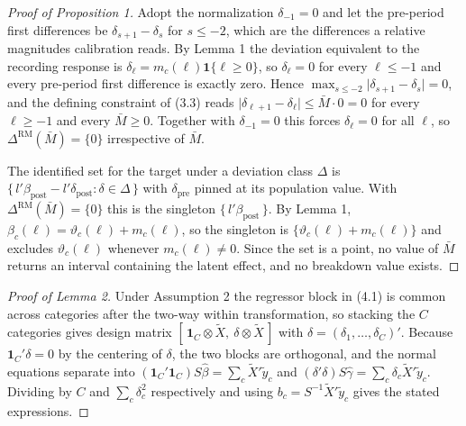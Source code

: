 \documentclass[12pt]{article}
\theoremstyle{definition}
\numberwithin{equation}{section}
\begin{document}
\begin{proof}[Proof of Proposition 1]
Adopt the normalization $\delta_{-1}=0$ and let the pre-period first differences
be $\delta_{s+1}-\delta_s$ for $s \le -2$, which are the differences a
relative magnitudes calibration reads. By Lemma 1 the deviation
equivalent to the recording response is $\delta_\ell = m_c(\ell)\mathbf 1\{\ell
\ge 0\}$, so $\delta_\ell = 0$ for every $\ell \le -1$ and every pre-period first
difference is exactly zero. Hence
$\max_{s \le -2}\lvert \delta_{s+1}-\delta_s \rvert = 0$, and the defining constraint
of (3.3) reads $\lvert \delta_{\ell+1}-\delta_\ell \rvert \le \bar M
\cdot 0 = 0$ for every $\ell \ge -1$ and every $\bar M \ge 0$. Together with
$\delta_{-1}=0$ this forces $\delta_\ell = 0$ for all $\ell$, so
$\Delta^{\mathrm{RM}}(\bar M) = \{0\}$ irrespective of $\bar M$.

The identified set for the target under a deviation class $\Delta$ is
$\{\,l'\beta_{\mathrm{post}} - l'\delta_{\mathrm{post}} : \delta \in \Delta\,\}$
with $\delta_{\mathrm{pre}}$ pinned at its population value. With
$\Delta^{\mathrm{RM}}(\bar M) = \{0\}$ this is the singleton
$\{\,l'\beta_{\mathrm{post}}\,\}$. By Lemma 1,
$\beta_c(\ell) = \vartheta_c(\ell) + m_c(\ell)$, so the singleton is
$\{\vartheta_c(\ell) + m_c(\ell)\}$ and excludes $\vartheta_c(\ell)$ whenever
$m_c(\ell) \ne 0$. Since the set is a point, no value of $\bar M$ returns an
interval containing the latent effect, and no breakdown value exists.
\end{proof}

\begin{proof}[Proof of Lemma 2]
Under Assumption 2 the regressor block in (4.1) is common
across categories after the two-way within transformation, so stacking the $C$
categories gives design matrix $[\,\mathbf{1}_C \otimes \tilde{X},\ \delta
\otimes \tilde{X}\,]$ with $\delta = (\delta_1,\dots,\delta_C)'$. Because
$\mathbf{1}_C'\delta = 0$ by the centering of $\delta$, the two blocks are
orthogonal, and the normal equations separate into
$(\mathbf{1}_C'\mathbf{1}_C) S \hat{\beta} = \sum_c \tilde{X}'\tilde{y}_c$ and
$(\delta'\delta) S \hat{\gamma} = \sum_c \delta_c \tilde{X}'\tilde{y}_c$.
Dividing by $C$ and $\sum_c \delta_c^2$ respectively and using $b_c =
S^{-1}\tilde{X}'\tilde{y}_c$ gives the stated expressions.
\end{proof}
\end{document}
